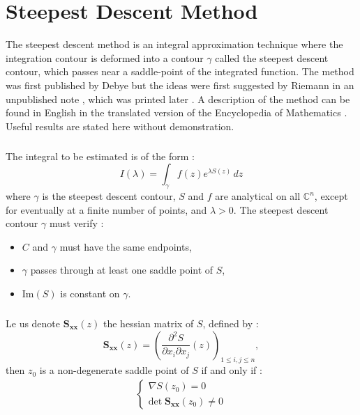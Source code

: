 \chapter{Steepest Descent Method}
\label{PhaseStationnaire}
The steepest descent method is an integral approximation technique where the integration contour is deformed into a contour $\gamma$ called the steepest descent contour, which passes near a saddle-point of the integrated function. The method was first published by Debye \cite{Debye} but the ideas were first suggested by Riemann in an unpublished note \cite{RiemannUnpub}, which was printed later \cite{Riemann}. A description of the method can be found in English in the translated version of the Encyclopedia of Mathematics \cite{Encycl}. Useful results are stated here without demonstration.

\paragraph{}
The integral to be estimated is of the form :
\begin{equation}
I(\lambda)=\int_{\gamma} f(z)e^{\lambda S(z)}\,dz
\end{equation}
where $\gamma$ is the steepest descent contour, $S$ and $f$ are analytical on all $\mathbb{C}^n$, except for eventually at a finite number of points, and $\lambda>0$. The steepest descent contour $\gamma$ must verify :
\begin{itemize}
\item $C$ and $\gamma$ must have the same endpoints,
\item $\gamma$ passes through at least one saddle point of $S$,
\item Im$(S)$ is constant on $\gamma$.
\end{itemize}

\paragraph{}
Le us denote $\mathbf{S_{xx}}(z)$ the hessian matrix of $S$, defined by :
\begin{equation}
\mathbf{S_{xx}}(z)=\left( \frac{\partial^2 S}{\partial x_i \partial x_j}(z) \right)_{1\leq i,j \leq n},
\end{equation}
then $z_ 0$ is a non-degenerate saddle point of $S$ if and only if :
\begin{eqnarray}
\left\{
\begin{array}{l}
\nabla S(z_0)=0 \\
\mbox{det} \; \mathbf{S_{xx}}(z_0) \neq 0
\end{array}
\right.
\end{eqnarray}

